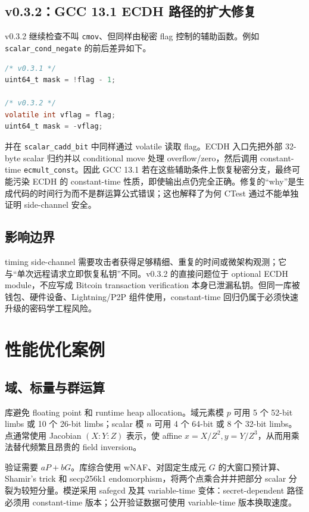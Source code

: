 \documentclass[11pt,a4paper,fontset=none]{ctexart}
\begin{document}
\newpage
\subsection{v0.3.2：GCC 13.1 ECDH 路径的扩大修复}

v0.3.2 继续检查不叫 \texttt{cmov}、但同样由秘密 flag 控制的辅助函数。例如 \texttt{scalar\_cond\_negate} 的前后差异如下。
\begin{lstlisting}[language=C,caption={v0.3.1 到 v0.3.2 的 conditional negate 变化}]
/* v0.3.1 */
uint64_t mask = !flag - 1;

/* v0.3.2 */
volatile int vflag = flag;
uint64_t mask = -vflag;
\end{lstlisting}
并在 \texttt{scalar\_cadd\_bit} 中同样通过 volatile 读取 flag。ECDH 入口先把外部 32-byte scalar 归约并以 conditional move 处理 overflow/zero，然后调用 constant-time \texttt{ecmult\_const}。因此 GCC 13.1 若在这些辅助条件上恢复秘密分支，最终可能污染 ECDH 的 constant-time 性质，即使输出点仍完全正确。修复的“why”是生成代码的时间行为而不是群运算公式错误；这也解释了为何 CTest 通过不能单独证明 side-channel 安全。

\subsection{影响边界}

timing side-channel 需要攻击者获得足够精细、重复的时间或微架构观测；它与“单次远程请求立即恢复私钥”不同。v0.3.2 的直接问题位于 optional ECDH module，不应写成 Bitcoin transaction verification 本身已泄漏私钥。但同一库被钱包、硬件设备、Lightning/P2P 组件使用，constant-time 回归仍属于必须快速升级的密码学工程风险。

\section{性能优化案例}

\subsection{域、标量与群运算}

库避免 floating point 和 runtime heap allocation。域元素模 $p$ 可用 5 个 52-bit limbs 或 10 个 26-bit limbs；scalar 模 $n$ 可用 4 个 64-bit 或 8 个 32-bit limbs。点通常使用 Jacobian $(X:Y:Z)$ 表示，使 affine $x=X/Z^2,y=Y/Z^3$，从而用乘法替代频繁且昂贵的 field inversion。

验证需要 $aP+bG$。库综合使用 wNAF、对固定生成元 $G$ 的大窗口预计算、Shamir's trick 和 secp256k1 endomorphism，将两个点乘合并并把部分 scalar 分裂为较短分量。模逆采用 safegcd 及其 variable-time 变体：secret-dependent 路径必须用 constant-time 版本；公开验证数据可使用 variable-time 版本换取速度。
\end{document}
